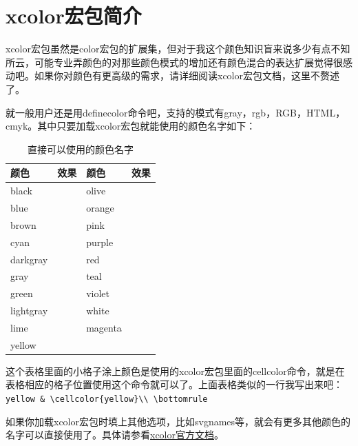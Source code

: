 \documentclass[11pt,oneside]{book}
\begin{document}
\section{xcolor宏包简介}   
xcolor宏包虽然是color宏包的扩展集，但对于我这个颜色知识盲来说多少有点不知所云，可能专业弄颜色的对那些颜色模式的增加还有颜色混合的表达扩展觉得很感动吧。如果你对颜色有更高级的需求，请详细阅读xcolor宏包文档，这里不赘述了。

就一般用户还是用definecolor命令吧，支持的模式有gray，rgb，RGB，HTML，cmyk。其中只要加载xcolor宏包就能使用的颜色名字如下：
\begin{table}[H]
\centering
\begin{tabular}{@{}lp{50pt}lp{50pt}@{}}
\toprule
颜色        & 效果  & 颜色       & 效果\\ \midrule
black     &  \cellcolor{black}  & olive     &    \cellcolor{olive} \\
blue      &   \cellcolor{blue} & orange    &   \cellcolor{orange}\\
brown     &  \cellcolor{brown}  & pink      &   \cellcolor{pink}\\
cyan      &   \cellcolor{cyan} & purple    &   \cellcolor{purple}\\
darkgray  &  \cellcolor{darkgray} &red       &   \cellcolor{red}  \\
gray      &   \cellcolor{gray} & teal      &    \cellcolor{teal}\\
green     &   \cellcolor{green} & violet    &   \cellcolor{violet}\\
lightgray &  \cellcolor{lightgray} &white     &   \cellcolor{white} \\
lime      &    \cellcolor{lime} & magenta   &   \cellcolor{magenta} \\
yellow    &    \cellcolor{yellow}\\ \bottomrule
\end{tabular}
\label{tab:直接可以使用的颜色名字}
\caption{直接可以使用的颜色名字}
\end{table}
这个表格里面的小格子涂上颜色是使用的xcolor宏包里面的cellcolor命令，就是在表格相应的格子位置使用这个命令就可以了。上面表格类似的一行我写出来吧：\\
\verb+yellow & \cellcolor{yellow}\\ \bottomrule+

如果你加载xcolor宏包时填上其他选项，比如svgnames等，就会有更多其他颜色的名字可以直接使用了。具体请参看\href{http://mirrors.ctan.org/macros/latex/contrib/xcolor/xcolor.pdf}{xcolor官方文档}。
\end{document}
